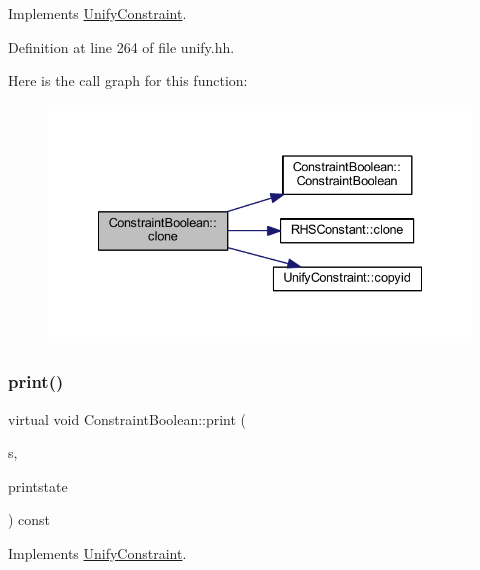 Implements \mbox{\hyperlink{class_unify_constraint_a4f068343932637d355644bb21559aa12}{Unify\+Constraint}}.



Definition at line 264 of file unify.\+hh.

Here is the call graph for this function\+:
\nopagebreak
\begin{figure}[H]
\begin{center}
\leavevmode
\includegraphics[width=335pt]{class_constraint_boolean_a3b258aaef6abed8c36455b562016cfbc_cgraph}
\end{center}
\end{figure}
\mbox{\label{class_constraint_boolean_a0cee08ca55cc80bd120ea52e8e52f290}} 
\subsubsection{\texorpdfstring{print()}{print()}}
{\footnotesize\ttfamily virtual void Constraint\+Boolean\+::print (\begin{DoxyParamCaption}\item[{ostream \&}]{s,  }\item[{\mbox{\hyperlink{class_unify_c_printer}{Unify\+C\+Printer}} \&}]{printstate }\end{DoxyParamCaption}) const\hspace{0.3cm}{\ttfamily [virtual]}}



Implements \mbox{\hyperlink{class_unify_constraint_a774f6a611a96384766cb8e8d8f5ff41f}{Unify\+Constraint}}.

\mbox{\label{class_constraint_boolean_af67fc020025d19e97b82dd7c7483cf1a}} 
